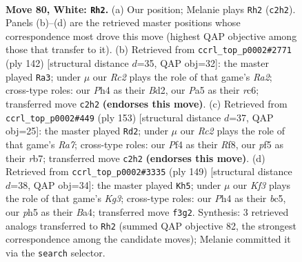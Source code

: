 \documentclass[11pt]{article}
\begin{document}
\clearpage

\begin{figure}[p]\centering
\begin{subfigure}{0.46\textwidth}\centering
\resizebox{\linewidth}{!}{%
\newchessgame
\chessboard[
  setfen={8/8/p5r1/Pppk1p1p/2p2P1P/4PKP1/1PR5/8 w - - 5 80},
  showmover=false,
  pgfstyle=straightmove, color=movearrow, markmove={c2-h2}
]}
\caption{}
\end{subfigure}\hfill
\begin{subfigure}{0.46\textwidth}\centering
\resizebox{\linewidth}{!}{%
\newchessgame
\chessboard[
  setfen={3b4/8/2rp2p1/1k1p1p1p/p2P3P/4P1P1/RP1B1P2/3K4 w - - 50 72},
  showmover=false,
  pgfstyle=straightmove, color=movearrow, markmove={a2-a3}
]}
\caption{}
\end{subfigure}
\\[4pt]
\begin{subfigure}{0.46\textwidth}\centering
\resizebox{\linewidth}{!}{%
\newchessgame
\chessboard[
  setfen={5r2/1RR2p2/4pk2/3p1p1p/3P3P/4PKP1/r4P2/8 b - - 7 77},
  showmover=false,
  pgfstyle=straightmove, color=movearrow, markmove={a2-d2}
]}
\caption{}
\end{subfigure}\hfill
\begin{subfigure}{0.46\textwidth}\centering
\resizebox{\linewidth}{!}{%
\newchessgame
\chessboard[
  setfen={7R/1r4p1/4p1kp/2Bp1p2/bP1P1P2/4K1PP/8/8 b - - 18 75},
  showmover=false,
  pgfstyle=straightmove, color=movearrow, markmove={g6-h5}
]}
\caption{}
\end{subfigure}
\caption{\textbf{Move 80, White: \texttt{Rh2}.} (a) Our position; Melanie plays \texttt{Rh2} (\texttt{c2h2}). Panels (b)--(d) are the retrieved master positions whose correspondence most drove this move (highest QAP objective among those that transfer to it). (b) Retrieved from \texttt{ccrl\_top\_p0002\#2771} (ply 142) [structural distance $d$=35, QAP obj=32]: the master played \texttt{Ra3}; under $\mu$ our \emph{Rc2} plays the role of that game's \emph{Ra2}; cross-type roles: our \emph{P}h4 as their \emph{B}d2, our \emph{P}a5 as their \emph{r}c6; transferred move \texttt{c2h2} \textbf{(endorses this move)}. (c) Retrieved from \texttt{ccrl\_top\_p0002\#449} (ply 153) [structural distance $d$=37, QAP obj=25]: the master played \texttt{Rd2}; under $\mu$ our \emph{Rc2} plays the role of that game's \emph{Ra7}; cross-type roles: our \emph{P}f4 as their \emph{R}f8, our \emph{p}f5 as their \emph{r}b7; transferred move \texttt{c2h2} \textbf{(endorses this move)}. (d) Retrieved from \texttt{ccrl\_top\_p0002\#3335} (ply 149) [structural distance $d$=38, QAP obj=34]: the master played \texttt{Kh5}; under $\mu$ our \emph{Kf3} plays the role of that game's \emph{Kg3}; cross-type roles: our \emph{P}h4 as their \emph{b}c5, our \emph{p}h5 as their \emph{B}a4; transferred move \texttt{f3g2}. Synthesis: 3 retrieved analogs transferred to \texttt{Rh2} (summed QAP objective 82, the strongest correspondence among the candidate moves); Melanie committed it via the \texttt{search} selector.}
\label{fig:thought-m158}
\end{figure}
\end{document}
